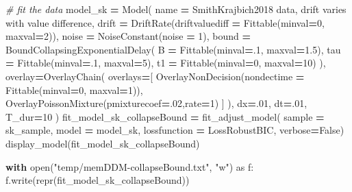 \documentclass[
]{book}
\newenvironment{Shaded}{\begin{snugshade}}{\end{snugshade}}
\newcommand{\BuiltInTok}[1]{#1}
\newcommand{\CommentTok}[1]{\textcolor[rgb]{0.56,0.35,0.01}{\textit{#1}}}
\newcommand{\ControlFlowTok}[1]{\textcolor[rgb]{0.13,0.29,0.53}{\textbf{#1}}}
\newcommand{\DecValTok}[1]{\textcolor[rgb]{0.00,0.00,0.81}{#1}}
\newcommand{\FloatTok}[1]{\textcolor[rgb]{0.00,0.00,0.81}{#1}}
\newcommand{\ImportTok}[1]{#1}
\newcommand{\NormalTok}[1]{#1}
\newcommand{\OperatorTok}[1]{\textcolor[rgb]{0.81,0.36,0.00}{\textbf{#1}}}
\newcommand{\StringTok}[1]{\textcolor[rgb]{0.31,0.60,0.02}{#1}}
\newcommand{\VariableTok}[1]{\textcolor[rgb]{0.00,0.00,0.00}{#1}}
\begin{document}
\begin{Shaded}
\begin{Highlighting}[]
\CommentTok{\# fit the data}
\NormalTok{model\_sk }\OperatorTok{=}\NormalTok{ Model(}
\NormalTok{  name }\OperatorTok{=} \StringTok{\textquotesingle{}SmithKrajbich2018 data, drift varies with value difference\textquotesingle{}}\NormalTok{,}
\NormalTok{  drift }\OperatorTok{=}\NormalTok{ DriftRate(driftvaluediff }\OperatorTok{=}\NormalTok{ Fittable(minval}\OperatorTok{=}\DecValTok{0}\NormalTok{, maxval}\OperatorTok{=}\DecValTok{2}\NormalTok{)),}
\NormalTok{  noise }\OperatorTok{=}\NormalTok{ NoiseConstant(noise }\OperatorTok{=} \DecValTok{1}\NormalTok{),}
\NormalTok{  bound }\OperatorTok{=}\NormalTok{ BoundCollapsingExponentialDelay(}
\NormalTok{    B }\OperatorTok{=}\NormalTok{ Fittable(minval}\OperatorTok{=}\FloatTok{.1}\NormalTok{, maxval}\OperatorTok{=}\FloatTok{1.5}\NormalTok{),}
\NormalTok{    tau }\OperatorTok{=}\NormalTok{ Fittable(minval}\OperatorTok{=}\FloatTok{.1}\NormalTok{, maxval}\OperatorTok{=}\DecValTok{5}\NormalTok{),}
\NormalTok{    t1 }\OperatorTok{=}\NormalTok{ Fittable(minval}\OperatorTok{=}\DecValTok{0}\NormalTok{, maxval}\OperatorTok{=}\DecValTok{10}\NormalTok{)}
\NormalTok{  ),}
\NormalTok{  overlay}\OperatorTok{=}\NormalTok{OverlayChain(}
\NormalTok{    overlays}\OperatorTok{=}\NormalTok{[}
\NormalTok{      OverlayNonDecision(nondectime }\OperatorTok{=}\NormalTok{ Fittable(minval}\OperatorTok{=}\DecValTok{0}\NormalTok{, maxval}\OperatorTok{=}\DecValTok{1}\NormalTok{)), }
\NormalTok{      OverlayPoissonMixture(pmixturecoef}\OperatorTok{=}\FloatTok{.02}\NormalTok{,rate}\OperatorTok{=}\DecValTok{1}\NormalTok{)}
\NormalTok{    ]}
\NormalTok{  ),}
\NormalTok{  dx}\OperatorTok{=}\FloatTok{.01}\NormalTok{, }
\NormalTok{  dt}\OperatorTok{=}\FloatTok{.01}\NormalTok{, }
\NormalTok{  T\_dur}\OperatorTok{=}\DecValTok{10}
\NormalTok{)}
\NormalTok{fit\_model\_sk\_collapseBound }\OperatorTok{=}\NormalTok{ fit\_adjust\_model(}
\NormalTok{  sample }\OperatorTok{=}\NormalTok{ sk\_sample, }
\NormalTok{  model }\OperatorTok{=}\NormalTok{ model\_sk,}
\NormalTok{  lossfunction }\OperatorTok{=}\NormalTok{ LossRobustBIC,}
\NormalTok{  verbose}\OperatorTok{=}\VariableTok{False}\NormalTok{)}
\NormalTok{display\_model(fit\_model\_sk\_collapseBound)}

\ControlFlowTok{with} \BuiltInTok{open}\NormalTok{(}\StringTok{"temp/memDDM{-}collapseBound.txt"}\NormalTok{, }\StringTok{"w"}\NormalTok{) }\ImportTok{as}\NormalTok{ f:}
\NormalTok{    f.write(}\BuiltInTok{repr}\NormalTok{(fit\_model\_sk\_collapseBound))}
\end{Highlighting}
\end{Shaded}
\end{document}
